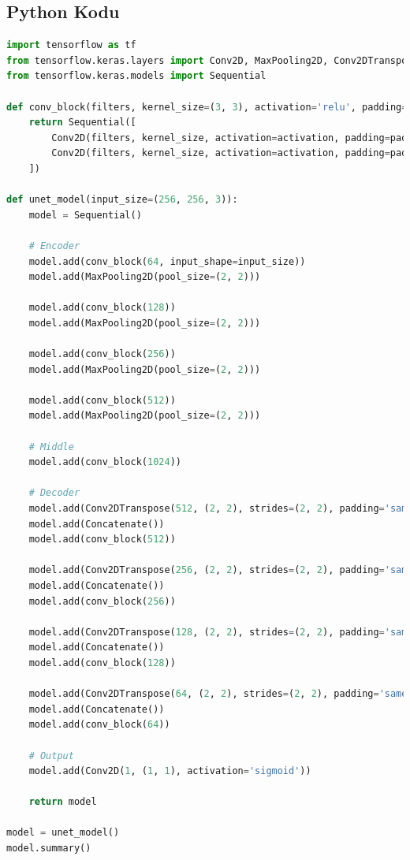 \subsection{Python Kodu}

\begin{lstlisting}[language=Python]
import tensorflow as tf
from tensorflow.keras.layers import Conv2D, MaxPooling2D, Conv2DTranspose, Concatenate
from tensorflow.keras.models import Sequential

def conv_block(filters, kernel_size=(3, 3), activation='relu', padding='same'):
    return Sequential([
        Conv2D(filters, kernel_size, activation=activation, padding=padding),
        Conv2D(filters, kernel_size, activation=activation, padding=padding)
    ])

def unet_model(input_size=(256, 256, 3)):
    model = Sequential()
    
    # Encoder
    model.add(conv_block(64, input_shape=input_size))
    model.add(MaxPooling2D(pool_size=(2, 2)))
    
    model.add(conv_block(128))
    model.add(MaxPooling2D(pool_size=(2, 2)))
    
    model.add(conv_block(256))
    model.add(MaxPooling2D(pool_size=(2, 2)))
    
    model.add(conv_block(512))
    model.add(MaxPooling2D(pool_size=(2, 2)))
    
    # Middle
    model.add(conv_block(1024))
    
    # Decoder
    model.add(Conv2DTranspose(512, (2, 2), strides=(2, 2), padding='same'))
    model.add(Concatenate())
    model.add(conv_block(512))
    
    model.add(Conv2DTranspose(256, (2, 2), strides=(2, 2), padding='same'))
    model.add(Concatenate())
    model.add(conv_block(256))
    
    model.add(Conv2DTranspose(128, (2, 2), strides=(2, 2), padding='same'))
    model.add(Concatenate())
    model.add(conv_block(128))
    
    model.add(Conv2DTranspose(64, (2, 2), strides=(2, 2), padding='same'))
    model.add(Concatenate())
    model.add(conv_block(64))
    
    # Output
    model.add(Conv2D(1, (1, 1), activation='sigmoid'))
    
    return model

model = unet_model()
model.summary()
\end{lstlisting}

